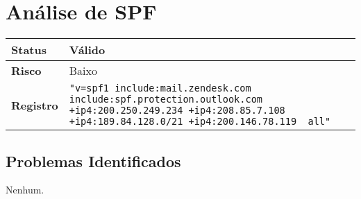 
    \section{Análise de SPF}
    \begin{tabularx}{\textwidth}{|l|X|}
    \hline
    \textbf{Status} & Válido \\ \hline
    \textbf{Risco} & Baixo \\ \hline
    \textbf{Registro} & \texttt{"v=spf1 include:mail.zendesk.com include:spf.protection.outlook.com +ip4:200.250.249.234 +ip4:208.85.7.108  +ip4:189.84.128.0/21 +ip4:200.146.78.119 ~all"} \\ \hline
    \end{tabularx}

    \subsection*{Problemas Identificados}
    Nenhum.
    